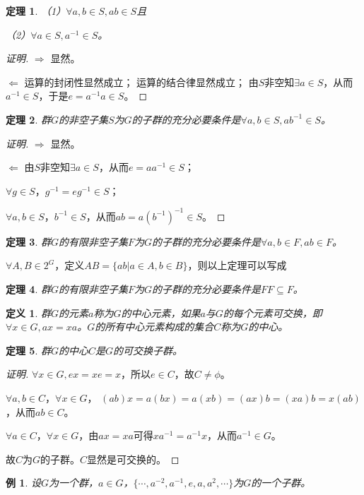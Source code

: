 \documentclass{article}
\newtheorem{Def}{定义}
\newtheorem{Thm}{定理}
\newtheorem*{Example}{例}
\begin{document}
\begin{CJK*}{UTF8}{gbsn}
\begin{Thm}
    （1）$\forall a,b\in S, ab\in S$且
  
    （2）$\forall a\in S, a^{-1}\in S$。
   \end{Thm}
  \begin{proof}[证明]
    $\Rightarrow$ 显然。
  
    $\Leftarrow$
    运算的封闭性显然成立；
    运算的结合律显然成立；
    由$S$非空知$\exists a\in S$，从而$a^{-1}\in S$，于是$e=a^{-1}a\in S$。
  \end{proof}
   \begin{Thm}
    群$G$的非空子集$S$为$G$的子群的充分必要条件是$\forall a,b\in S, ab^{-1}\in S$。
   \end{Thm}
   \begin{proof}[证明]
    $\Rightarrow$ 显然。
  
    $\Leftarrow$
    由$S$非空知$\exists a\in S$，从而$e=aa^{-1}\in S$；
  
    $\forall g\in S$，$g^{-1}=eg^{-1}\in S$；
  
    $\forall a,b\in S$，$b^{-1}\in S$，从而$ab=a(b^{-1})^{-1}\in S$。
  \end{proof}
  
   \begin{Thm}
    群$G$的有限非空子集$F$为$G$的子群的充分必要条件是$\forall a,b\in F, ab\in F$。
   \end{Thm}
  
   $\forall A,B\in 2^G$，定义$AB=\{ab|a\in A,b\in B\}$，则以上定理可以写成
  
   \begin{Thm}
    群$G$的有限非空子集$F$为$G$的子群的充分必要条件是$FF\subseteq F$。
   \end{Thm}
   \begin{Def}
    群$G$的元素$a$称为$G$的中心元素，如果$a$与$G$的每个元素可交换，即$\forall x\in G, ax=xa$。$G$的所有中心元素构成的集合$C$称为$G$的中心。
   \end{Def}
   \begin{Thm}
    群$G$的中心$C$是$G$的可交换子群。
   \end{Thm}
  \begin{proof}[证明]
  $\forall x\in G, ex=xe=x$，所以$e\in C$，故$C\neq \phi$。
  
  $\forall a,b\in C$，$\forall x\in G$，
  $(ab)x=a(bx)=a(xb)=(ax)b=(xa)b=x(ab)$，从而$ab\in C$。
  
  $\forall a\in C$，$\forall x\in G$，由$ax=xa$可得$xa^{-1}=a^{-1}x$，从而$a^{-1}\in G$。
  
  故$C$为$G$的子群。$C$显然是可交换的。
  \end{proof}
  \begin{Example}
    设$G$为一个群，$a\in G$，$\{\cdots,a^{-2},a^{-1},e,a,a^2,\cdots\}$为$G$的一个子群。
  \end{Example}
  

\end{CJK*}
\end{document}
